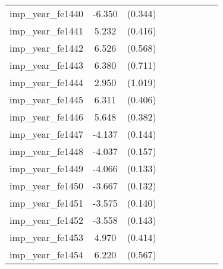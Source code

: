 {\begin{tabular}{l*{4}{cc}}
imp\_year\_fe1440&   -6.350\sym{***}&  (0.344)&                  &         &                  &         &                  &         \\
imp\_year\_fe1441&    5.232\sym{***}&  (0.416)&                  &         &                  &         &                  &         \\
imp\_year\_fe1442&    6.526\sym{***}&  (0.568)&                  &         &                  &         &                  &         \\
imp\_year\_fe1443&    6.380\sym{***}&  (0.711)&                  &         &                  &         &                  &         \\
imp\_year\_fe1444&    2.950\sym{**} &  (1.019)&                  &         &                  &         &                  &         \\
imp\_year\_fe1445&    6.311\sym{***}&  (0.406)&                  &         &                  &         &                  &         \\
imp\_year\_fe1446&    5.648\sym{***}&  (0.382)&                  &         &                  &         &                  &         \\
imp\_year\_fe1447&   -4.137\sym{***}&  (0.144)&                  &         &                  &         &                  &         \\
imp\_year\_fe1448&   -4.037\sym{***}&  (0.157)&                  &         &                  &         &                  &         \\
imp\_year\_fe1449&   -4.066\sym{***}&  (0.133)&                  &         &                  &         &                  &         \\
imp\_year\_fe1450&   -3.667\sym{***}&  (0.132)&                  &         &                  &         &                  &         \\
imp\_year\_fe1451&   -3.575\sym{***}&  (0.140)&                  &         &                  &         &                  &         \\
imp\_year\_fe1452&   -3.558\sym{***}&  (0.143)&                  &         &                  &         &                  &         \\
imp\_year\_fe1453&    4.970\sym{***}&  (0.414)&                  &         &                  &         &                  &         \\
imp\_year\_fe1454&    6.220\sym{***}&  (0.567)&                  &         &                  &         &                  &         \\

\end{tabular}}
